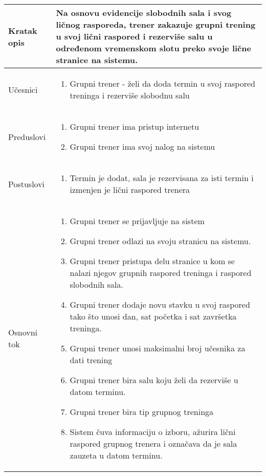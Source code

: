 \documentclass[../grupniTreninzi.tex]{subfiles}
\begin{document}
\begin{longtable}{| p{} | p{} |} 
\hline
    Kratak opis &  Na osnovu evidencije slobodnih sala i svog ličnog rasporeda, trener zakazuje grupni trening u svoj lični raspored i rezerviše salu u određenom vremenskom slotu preko svoje lične stranice na sistemu.\\ 
\hline    
    Učesnici &
    \begin{enumerate}
        \item Grupni trener - želi da doda termin u svoj raspored treninga i rezerviše slobodnu salu
    \end{enumerate}\\
\hline
   Preduslovi & 
   \begin{enumerate}
        \item Grupni trener ima pristup internetu
        \item Grupni trener ima svoj nalog na sistemu
    \end{enumerate}\\
\hline  
    Postuslovi &
    \begin{enumerate}
        \item Termin je dodat, sala je rezervisana za isti termin i izmenjen je lični raspored trenera
    \end{enumerate}\\
\hline
    Osnovni tok & 
    \begin{enumerate}
        \item Grupni trener se prijavljuje na sistem
        \item Grupni trener odlazi na svoju stranicu na sistemu.
        \item Grupni trener pristupa delu stranice u kom se nalazi njegov grupnih raspored treninga i raspored slobodnih sala.
        \item Grupni trener dodaje novu stavku u svoj raspored tako što unosi dan, sat početka i sat završetka treninga.
        \item Grupni trener unosi maksimalni broj učesnika za dati trening
        \item Grupni trener bira salu koju želi da rezerviše u datom terminu.
        \item Grupni trener bira tip grupnog treninga
        \item Sistem čuva informaciju o izboru, ažurira lični raspored grupnog trenera i označava da je sala zauzeta u datom terminu.
    \end{enumerate}\\

\end{longtable}
\end{document}

